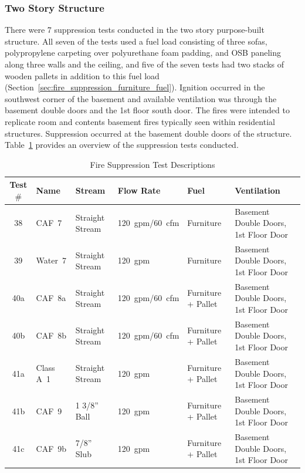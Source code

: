\documentclass[12pt,oneside]{book}
\begin{document}
\subsubsection*{Two Story Structure}
\label{sec:fire_supp_two}

There were 7 suppression tests conducted in the two story purpose-built structure. All seven of the tests used a fuel load consisting of three sofas, polypropylene carpeting over polyurethane foam padding, and OSB paneling along three walls and the ceiling, and five of the seven tests had two stacks of wooden pallets in addition to this fuel load (Section~\ref{sec:fire_suppression_furniture_fuel}). Ignition occurred in the southwest corner of the basement and available ventilation was through the basement double doors and the 1st floor south door. The fires were intended to replicate room and contents basement fires typically seen within residential structures. Suppression occurred at the basement double doors of the structure. Table~\ref{tab:Test_Descriptions_2} provides an overview of the suppression tests conducted.

\begin{table}[!ht]
\centering
\footnotesize
\caption{Fire Suppression Test Descriptions}\label{tab:Test_Descriptions_2}
\begin{tabular}{clllll}
\toprule[1.5pt]
Test $\#$  & Name	& Stream			& Flow Rate		& Fuel                    & Ventilation  \\
\midrule
 38  & CAF~7     &  Straight Stream  	&  120~gpm/60~cfm   & Furniture           & Basement Double Doors, 1st Floor Door \\
 39  & Water~7   &  Straight Stream  	&  120~gpm    		& Furniture           & Basement Double Doors, 1st Floor Door \\
 40a & CAF~8a    &  Straight Stream  	&  120~gpm/60~cfm   & Furniture + Pallet  & Basement Double Doors, 1st Floor Door \\
 40b & CAF~8b    &  Straight Stream  	&  120~gpm/60~cfm   & Furniture + Pallet  & Basement Double Doors, 1st Floor Door \\
 41a & Class A~1 &  Straight Stream  	&  120~gpm		    & Furniture + Pallet  & Basement Double Doors, 1st Floor Door \\
 41b & CAF~9     &  1 3/8'' Ball    	&  120~gpm		    & Furniture + Pallet  & Basement Double Doors, 1st Floor Door \\
 41c & CAF~9b    &  7/8'' Slub      	&  120~gpm		    & Furniture + Pallet  & Basement Double Doors, 1st Floor Door \\
\bottomrule[1.25pt]
\end{tabular}\par
\end{table}
\end{document}
